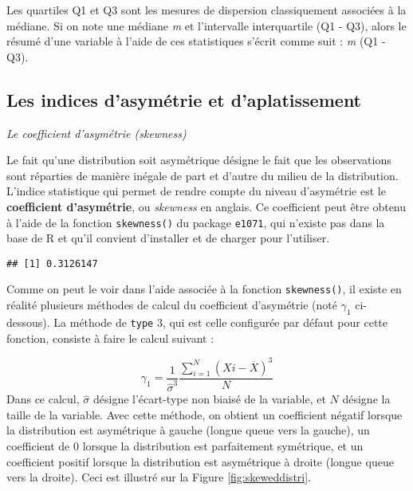 \documentclass[
  french,
]{book}
\newenvironment{Shaded}{\begin{snugshade}}{\end{snugshade}}
\newcommand{\DataTypeTok}[1]{\textcolor[rgb]{0.13,0.29,0.53}{#1}}
\newcommand{\DecValTok}[1]{\textcolor[rgb]{0.00,0.00,0.81}{#1}}
\newcommand{\KeywordTok}[1]{\textcolor[rgb]{0.13,0.29,0.53}{\textbf{#1}}}
\newcommand{\NormalTok}[1]{#1}
\newcommand{\OperatorTok}[1]{\textcolor[rgb]{0.81,0.36,0.00}{\textbf{#1}}}
\begin{document}
Les quartiles Q1 et Q3 sont les mesures de dispersion classiquement associées à la médiane. Si on note une médiane \emph{m} et l'intervalle interquartile (Q1 - Q3), alors le résumé d'une variable à l'aide de ces statistiques s'écrit comme suit : \emph{m} (Q1 - Q3).

\hypertarget{les-indices-dasymuxe9trie-et-daplatissement}{%
\subsection{Les indices d'asymétrie et d'aplatissement}\label{les-indices-dasymuxe9trie-et-daplatissement}}

\emph{Le coefficient d'asymétrie (skewness)}

Le fait qu'une distribution soit asymétrique désigne le fait que les observations sont réparties de manière inégale de part et d'autre du milieu de la distribution. L'indice statistique qui permet de rendre compte du niveau d'asymétrie est le \textbf{coefficient d'asymétrie}, ou \emph{skewness} en anglais. Ce coefficient peut être obtenu à l'aide de la fonction \texttt{skewness()} du package \texttt{e1071}, qui n'existe pas dans la base de R et qu'il convient d'installer et de charger pour l'utiliser.

\begin{Shaded}
\end{Shaded}

\begin{verbatim}
## [1] 0.3126147
\end{verbatim}

Comme on peut le voir dans l'aide associée à la fonction \texttt{skewness()}, il existe en réalité plusieurs méthodes de calcul du coefficient d'asymétrie (noté \(\gamma_{1}\) ci-dessous). La méthode de \texttt{type} 3, qui est celle configurée par défaut pour cette fonction, consiste à faire le calcul suivant :

\[\gamma_{1} =  \frac{1}{\hat{\sigma}^3} {\frac{\sum_{i=1}^{N} (X{i} - \overline{X})^3}{N}}\]
Dans ce calcul, \(\hat{\sigma}\) désigne l'écart-type non biaisé de la variable, et \(N\) désigne la taille de la variable. Avec cette méthode, on obtient un coefficient négatif lorsque la distribution est asymétrique à gauche (longue queue vers la gauche), un coefficient de 0 lorsque la distribution est parfaitement symétrique, et un coefficient positif lorsque la distribution est asymétrique à droite (longue queue vers la droite). Ceci est illustré sur la Figure \ref{fig:skeweddistri}.
\end{document}
